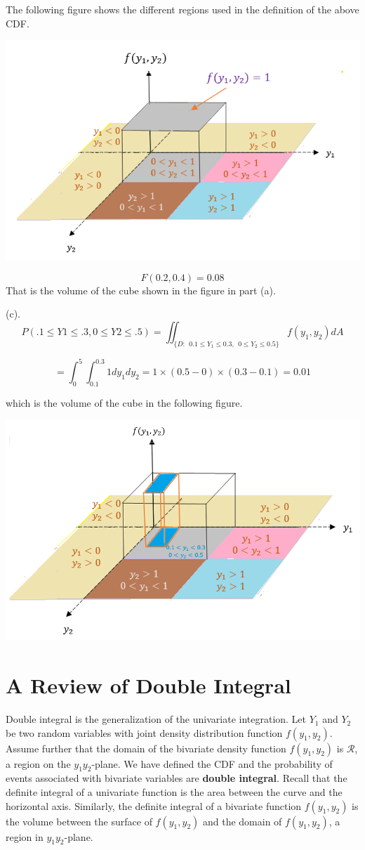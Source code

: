 \documentclass[
]{book}
\begin{document}
The following figure shows the different regions used in the definition of the above CDF.

\begin{center}\includegraphics[width=0.5\linewidth]{topic06/bivariateUnifExample02Part02} \end{center}

\[
F(0.2, 0.4) = 0.08
\] That is the volume of the cube shown in the figure in part (a).

(c).
\[P(.1 \le Y1 \le .3, 0 \le Y2 \le .5) =\iint_{\{D: \ \ 0.1 \le Y_1 \le 0.3, \ \ 0 \le Y_2 \le 0.5\}}f(y_1, y_2)dA
\]

\[
 = \int_0^5\int_{0.1}^{0.3}1dy_1dy_2 = 1\times (0.5-0)\times (0.3-0.1) = 0.01
\]

which is the volume of the cube in the following figure.

\begin{center}\includegraphics[width=0.5\linewidth]{topic06/bivariateUnifExample02Part03} \end{center}

\hfill\break

\hypertarget{a-review-of-double-integral}{%
\section{A Review of Double Integral}\label{a-review-of-double-integral}}

Double integral is the generalization of the univariate integration. Let \(Y_1\) and \(Y_2\) be two random variables with joint density distribution function \(f(y_1, y_2)\). Assume further that the domain of the bivariate density function \(f(y_1, y_2)\) is \(\mathcal{R}\), a region on the \(y_1y_2\)-plane. We have defined the CDF and the probability of events associated with bivariate variables are \textbf{double integral}. Recall that the definite integral of a univariate function is the area between the curve and the horizontal axis. Similarly, the definite integral of a bivariate function \(f(y_1, y_2)\) is the volume between the surface of \(f(y_1, y_2)\) and the domain of \(f(y_1, y_2)\), a region in \(y_1y_2\)-plane.
\end{document}
